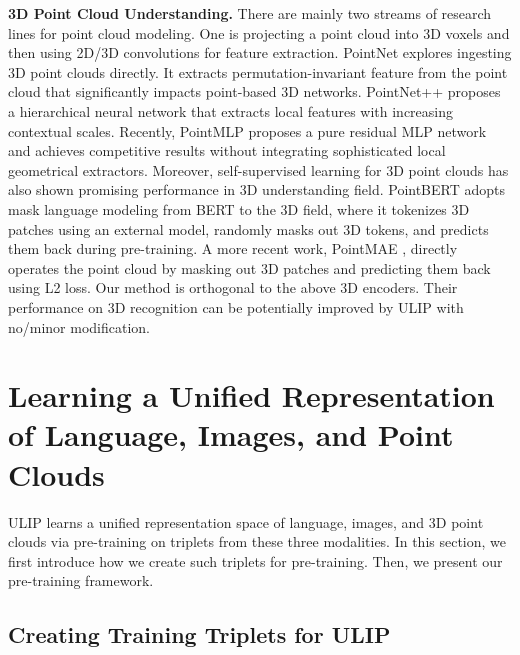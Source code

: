 \documentclass[10pt,twocolumn,letterpaper]{article}
\begin{document}
\noindent\textbf{3D Point Cloud Understanding.}
There are mainly two streams of research lines for point cloud modeling. One is projecting a point cloud into 3D voxels \cite{maturana2015voxnet,shi2020pv} and then using 2D/3D convolutions for feature extraction. PointNet \cite{qi2017pointnet} explores ingesting 3D point clouds directly. It extracts permutation-invariant feature from the point cloud that significantly impacts point-based 3D networks. PointNet++ \cite{qi2017pointnet++} proposes a hierarchical neural network that extracts local features with increasing contextual scales. Recently, PointMLP \cite{ma2022rethinking} proposes a pure residual MLP network and achieves competitive results without integrating sophisticated local geometrical extractors. 
Moreover, self-supervised learning for 3D point clouds has also shown promising performance in 3D understanding field. PointBERT \cite{yu2022point} adopts mask language modeling from BERT \cite{devlin2018bert} to the 3D field, where it tokenizes 3D patches using an external model, randomly masks out 3D tokens, and predicts them back during pre-training. A more recent work, PointMAE \cite{pang2022masked}, directly operates the point cloud by masking out 3D patches and predicting them back using L2 loss. Our method is orthogonal to the above 3D encoders. Their performance on 3D recognition can be potentially improved by ULIP with no/minor modification.

\section{Learning a Unified Representation of Language,
Images, and Point Clouds}
\label{sec:method}

ULIP learns a unified representation space of language, images, and 3D point clouds via pre-training on triplets from these three modalities. 
In this section, we first introduce how we create such triplets for pre-training. Then, we present our pre-training framework.

\subsection{Creating Training Triplets for ULIP}
\label{sec:create triplet}
\end{document}
